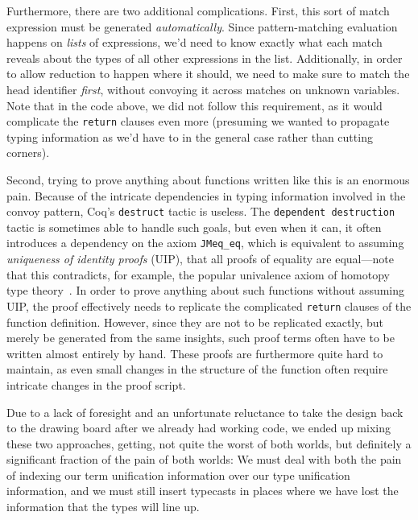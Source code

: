 Furthermore, there are two additional complications.
First, this sort of match expression must be generated \emph{automatically}.
Since pattern-matching evaluation happens on \emph{lists} of expressions, we'd need to know exactly what each match reveals about the types of all other expressions in the list.
Additionally, in order to allow reduction to happen where it should, we need to make sure to match the head identifier \emph{first}, without convoying it across matches on unknown variables.
Note that in the code above, we did not follow this requirement, as it would complicate the \texttt{return} clauses even more (presuming we wanted to propagate typing information as we'd have to in the general case rather than cutting corners).

Second, trying to prove anything about functions written like this is an enormous pain.
Because of the intricate dependencies in typing information involved in the convoy pattern, Coq's \texttt{destruct} tactic is useless.
The \texttt{dependent destruction} tactic is sometimes able to handle such goals, but even when it can, it often introduces a dependency on the axiom \texttt{JMeq_eq}, which is equivalent to assuming \emph{uniqueness of identity proofs} (UIP), that all proofs of equality are equal---note that this contradicts, for example, the popular univalence axiom of homotopy type theory~\cite{HoTTBook}.
In order to prove anything about such functions without assuming UIP, the proof effectively needs to replicate the complicated \texttt{return} clauses of the function definition.
However, since they are not to be replicated exactly, but merely be generated from the same insights, such proof terms often have to be written almost entirely by hand.
These proofs are furthermore quite hard to maintain, as even small changes in the structure of the function often require intricate changes in the proof script.

Due to a lack of foresight and an unfortunate reluctance to take the design back to the drawing board after we already had working code, we ended up mixing these two approaches, getting, not quite the worst of both worlds, but definitely a significant fraction of the pain of both worlds:
We must deal with both the pain of indexing our term unification information over our type unification information, and we must still insert typecasts in places where we have lost the information that the types will line up.

